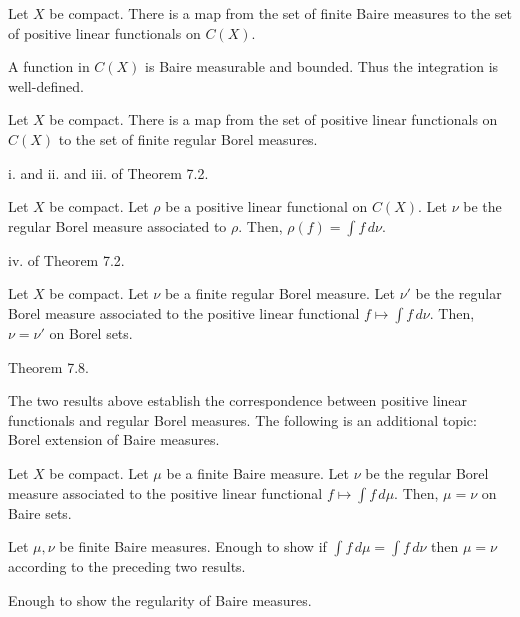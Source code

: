 \documentclass{../../large}
\begin{document}
\begin{prb}
Let $X$ be compact.
There is a map from the set of finite Baire measures to the set of positive linear functionals on $C(X)$.
\end{prb}
\begin{sol}
A function in $C(X)$ is Baire measurable and bounded.
Thus the integration is well-defined.
\end{sol}

\begin{prb}
Let $X$ be compact.
There is a map from the set of positive linear functionals on $C(X)$ to the set of finite regular Borel measures.
\end{prb}
\begin{sol}
i. and ii. and iii. of Theorem 7.2.
\end{sol}

\begin{prb}
Let $X$ be compact.
Let $\rho$ be a positive linear functional on $C(X)$.
Let $\nu$ be the regular Borel measure associated to $\rho$.
Then, $\rho(f)=\int f\,d\nu$.
\end{prb}
\begin{sol}
iv. of Theorem 7.2.
\end{sol}

\begin{prb}
Let $X$ be compact.
Let $\nu$ be a finite regular Borel measure.
Let $\nu'$ be the regular Borel measure associated to the positive linear functional $f\mapsto\int f\,d\nu$.
Then, $\nu=\nu'$ on Borel sets.
\end{prb}
\begin{sol}
Theorem 7.8.
\end{sol}

The two results above establish the correspondence between positive linear functionals and regular Borel measures.
The following is an additional topic: Borel extension of Baire measures.
\begin{prb}
Let $X$ be compact.
Let $\mu$ be a finite Baire measure.
Let $\nu$ be the regular Borel measure associated to the positive linear functional $f\mapsto\int f\,d\mu$.
Then, $\mu=\nu$ on Baire sets.
\end{prb}
\begin{sol}
Let $\mu,\nu$ be finite Baire measures.
Enough to show if $\int f\,d\mu=\int f\,d\nu$ then $\mu=\nu$ according to the preceding two results.

Enough to show the regularity of Baire measures.
\end{sol}
\end{document}
